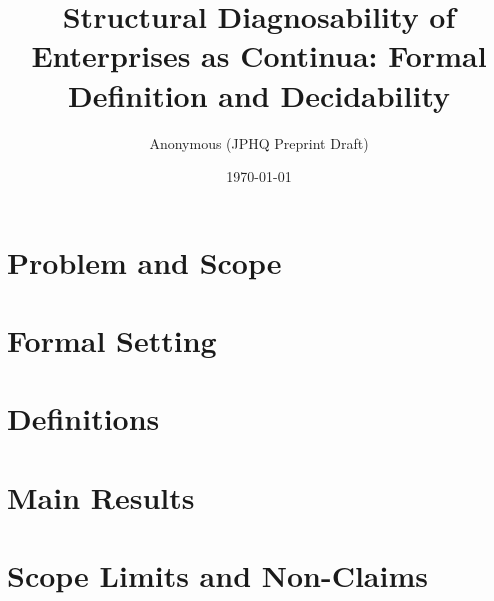 ﻿\documentclass[11pt]{article}
\title{Structural Diagnosability of Enterprises as Continua: Formal Definition and Decidability}
\author{Anonymous (JPHQ Preprint Draft)}
\date{\today}
\theoremstyle{plain}
\theoremstyle{definition}
\theoremstyle{remark}
\begin{document}
\maketitle



\section{Problem and Scope}


\section{Formal Setting}


\section{Definitions}


\section{Main Results}


\section{Scope Limits and Non-Claims}


\printbibliography
\end{document}
